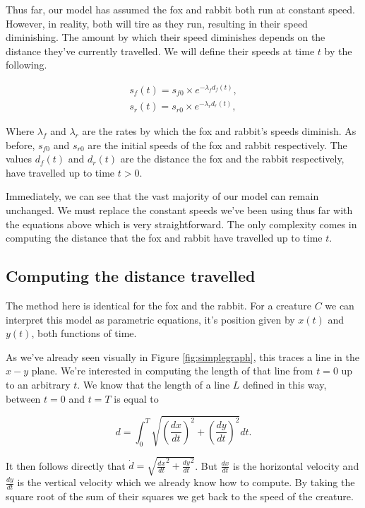 Thus far, our model has assumed the fox and rabbit both run at constant speed. However, in reality, both will tire as they run, resulting in their speed diminishing. The amount by which their speed diminishes depends on the distance they've currently travelled. We will define their speeds at time $t$ by the following.

\begin{equation}\label{eq:speeds}
\begin{split}
 s_f(t) = s_{f0} \times  e^{-\lambda_f  d_f(t)}, \\
 s_r(t) = s_{r0} \times  e^{-\lambda_r d_r(t)}, 
\end{split}
\end{equation}

Where $\lambda_f$ and $\lambda_r$ are the rates by which the fox and rabbit's speeds diminish. As before,  $s_{f0}$ and $s_{r0}$ are the initial speeds of the fox and rabbit respectively.  The values $d_f(t)$ and $d_r(t)$ are the distance the fox and the rabbit respectively, have travelled up to time $t > 0$.

Immediately, we can see that the vast majority of our model can remain unchanged. We must replace the constant speeds we've been using thus far with the equations above which is very straightforward. The only complexity comes in computing the distance that the fox and rabbit have travelled up to time $t$.

\subsection{Computing the distance travelled}

The method here is identical for the fox and the rabbit. For a creature $C$ we can interpret this model as parametric equations, it's position given by $x(t)$ and $y(t)$, both functions of time.

As we've already seen visually in Figure \ref{fig:simplegraph}, this traces a line in the $x-y$ plane. We're interested in computing the length of that line from $t=0$ up to an arbitrary $t$. We know that the length of a line $L$ defined in this way, between $t=0$ and $t=T$ is equal to

$$ d = \int_0^T \sqrt{{(\frac{dx}{dt})}^2 + {(\frac{dy}{dt})}^2} dt .$$

It then follows directly that $ \dot{d} =  \sqrt{{\frac{dx}{dt}}^2 + {\frac{dy}{dt}}^2} $. But $\frac{dx}{dt}$ is the horizontal velocity and $\frac{dy}{dt}$ is the vertical velocity which we already know how to compute. By taking the square root of the sum of their squares we get back to the speed of the creature.

